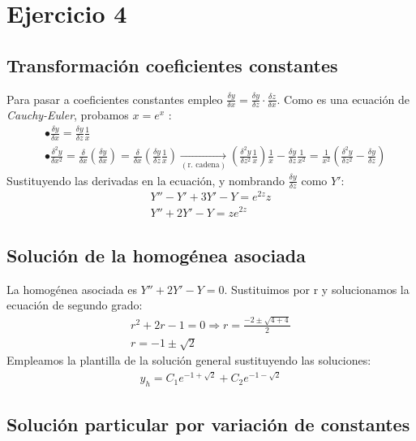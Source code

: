 \documentclass[]{scrartcl}
\begin{document}
\section{Ejercicio 4}

\subsection{Transformación coeficientes constantes}

Para pasar a coeficientes constantes empleo $\frac{\delta y}{\delta x}=\frac{\delta y}{\delta z}\cdot \frac{\delta z}{\delta x}$. Como es una ecuación de \textit{Cauchy-Euler}, probamos $x=e^x$ :
\begin{align*}
	&\bullet \frac{\delta y}{\delta x} = \frac{\delta y}{\delta z}\frac{1}{x}\\
	&\bullet \frac{\delta^2 y}{\delta x^2}=\frac{\delta }{\delta x}\left(\frac{\delta y}{\delta x}\right) = \frac{\delta }{\delta x}\left(\frac{\delta y}{\delta z}\frac{1}{x}\right) \xrightarrow[(\text{r. cadena})]{} \left( \frac{\delta^2 y}{\delta z^2}\frac{1}{x} \right)\frac{1}{x} -\frac{\delta y}{\delta z}\frac{1}{x^2} =\frac{1}{x^2}\left( \frac{\delta^2 y}{\delta z^2}-\frac{\delta y}{\delta z} \right)
\end{align*}
Sustituyendo las derivadas en la ecuación, y nombrando $\frac{\delta y}{\delta z}$ como $Y'$:
\begin{gather*}
	Y''-Y'+3Y'-Y=e^{2z}z\\ \boxed{Y''+2Y'-Y=ze^{2z}}
\end{gather*}

\subsection{Solución de la homogénea asociada}

La homogénea asociada es $Y''+2Y'-Y=0$. Sustituimos por r y solucionamos la ecuación de segundo grado:
\begin{gather*}
	r^2+2r-1=0\Rightarrow r=\frac{-2\pm\sqrt{4+4}}{2}\\
	r=-1\pm\sqrt{2}
\end{gather*}
Empleamos la plantilla de la solución general sustituyendo las soluciones:
\begin{gather*}
	\boxed{y_h=C_1e^{-1+\sqrt{2}}+C_2e^{-1-\sqrt{2}}}
\end{gather*}

\subsection{Solución particular por variación de constantes}
\end{document}
